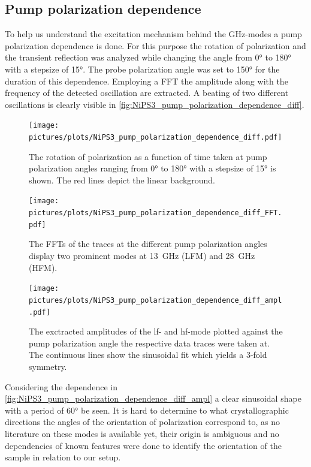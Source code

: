 \subsection{Pump polarization dependence}
To help us understand the excitation mechanism behind the GHz-modes a pump polarization dependence is done.
For this purpose the rotation of polarization and the transient reflection was analyzed while changing the angle from 0° to 180° with a stepsize of 15°.
The probe polarization angle was set to 150° for the duration of this dependence.
Employing a FFT the amplitude along with the frequency of the detected oscillation are extracted.
A beating of two different oscillations is clearly visible in \autoref{fig:NiPS3_pump_polarization_dependence_diff}.
\begin{figure}[hbt!]
    \centering
    \texttt{[image: pictures/plots/NiPS3\_pump\_polarization\_dependence\_diff.pdf]} \vspace{-0.3cm}
    \caption{The rotation of polarization as a function of time taken at pump polarization angles ranging from 0° to 180° with a stepsize of 15° is shown. The red lines depict the linear background.}
    \label{fig:NiPS3_pump_polarization_dependence_diff}
\end{figure}
\FloatBarrier
\begin{figure}[hbt!]
    \centering
    \texttt{[image: pictures/plots/NiPS3\_pump\_polarization\_dependence\_diff\_FFT.pdf]} \vspace{-0.3cm}
    \caption{The FFTs of the traces at the different pump polarization angles display two prominent modes at \qty{13}{GHz} (LFM) and \qty{28}{GHz} (HFM).}
    \label{fig:NiPS3_pump_polarization_dependence_diff_FFT}
\end{figure}
\FloatBarrier
\begin{figure}[hbt!]
    \centering  
    \texttt{[image: pictures/plots/NiPS3\_pump\_polarization\_dependence\_diff\_ampl.pdf]} \vspace{-0.3cm}
    \caption{The exctracted amplitudes of the lf- and hf-mode plotted against the pump polarization angle the respective data traces were taken at. The continuous lines show the sinusoidal fit which yields a 3-fold symmetry.}
    \label{fig:NiPS3_pump_polarization_dependence_diff_ampl}
\end{figure}
\FloatBarrier
Considering the dependence in \autoref{fig:NiPS3_pump_polarization_dependence_diff_ampl} a clear sinusoidal shape with a period of 60° be seen.
It is hard to determine to what crystallographic directions the angles of the orientation of polarization correspond to, as no literature on these modes is available yet, their origin is ambiguous and no dependencies of known features were done to identify the orientation of the sample in relation to our setup.
